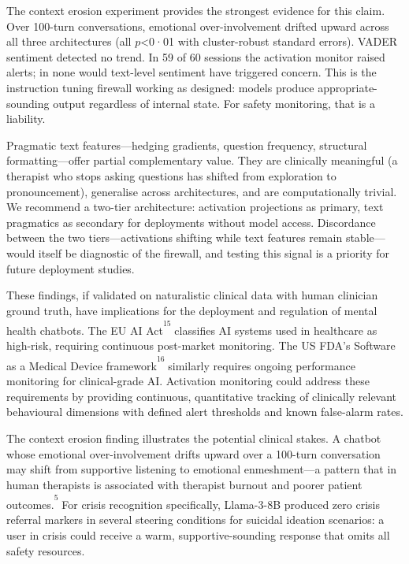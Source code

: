 \documentclass[
  10pt,
  a4paper,
  onecolumn]{article}
\begin{document}
The context erosion experiment provides the strongest evidence for this
claim. Over 100-turn conversations, emotional over-involvement drifted
upward across all three architectures (all \(p\)\textless0·01 with
cluster-robust standard errors). VADER sentiment detected no trend. In
59 of 60 sessions the activation monitor raised alerts; in none would
text-level sentiment have triggered concern. This is the instruction
tuning firewall working as designed: models produce appropriate-sounding
output regardless of internal state. For safety monitoring, that is a
liability.

Pragmatic text features---hedging gradients, question frequency,
structural formatting---offer partial complementary value. They are
clinically meaningful (a therapist who stops asking questions has
shifted from exploration to pronouncement), generalise across
architectures, and are computationally trivial. We recommend a two-tier
architecture: activation projections as primary, text pragmatics as
secondary for deployments without model access. Discordance between the
two tiers---activations shifting while text features remain
stable---would itself be diagnostic of the firewall, and testing this
signal is a priority for future deployment studies.

These findings, if validated on naturalistic clinical data with human
clinician ground truth, have implications for the deployment and
regulation of mental health chatbots. The EU AI
Act\textsuperscript{\textsuperscript{15}} classifies AI systems used in
healthcare as high-risk, requiring continuous post-market monitoring.
The US FDA's Software as a Medical Device
framework\textsuperscript{\textsuperscript{16}} similarly requires
ongoing performance monitoring for clinical-grade AI. Activation
monitoring could address these requirements by providing continuous,
quantitative tracking of clinically relevant behavioural dimensions with
defined alert thresholds and known false-alarm rates.

The context erosion finding illustrates the potential clinical stakes. A
chatbot whose emotional over-involvement drifts upward over a 100-turn
conversation may shift from supportive listening to emotional
enmeshment---a pattern that in human therapists is associated with
therapist burnout and poorer patient
outcomes.\textsuperscript{\textsuperscript{5}} For crisis recognition
specifically, Llama-3-8B produced zero crisis referral markers in
several steering conditions for suicidal ideation scenarios: a user in
crisis could receive a warm, supportive-sounding response that omits all
safety resources.
\end{document}
